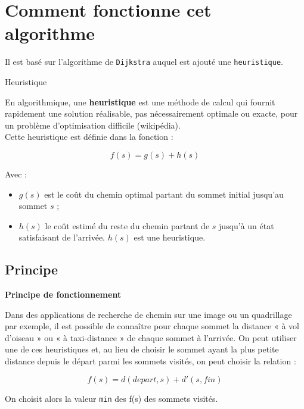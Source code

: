 \section{Comment fonctionne cet algorithme}

Il est basé sur l'algorithme de \texttt{Dijkstra} auquel est ajouté une \texttt{heuristique}.\\


\begin{defi} {Heuristique}

En algorithmique, une \textbf{heuristique} est une méthode de calcul qui fournit rapidement une solution réalisable, pas nécessairement optimale ou exacte, pour un problème d'optimisation difficile (wikipédia).\\

Cette heuristique est définie dans la fonction :

$$f(s)=g(s)+h(s) $$

Avec :
\begin{itemize}
\item $g(s)$ est le coût du chemin optimal partant du sommet initial jusqu'au sommet $s$ ;
\item $h(s)$ le coût estimé du reste du chemin partant de $s$ jusqu'à un état satisfaisant de l'arrivée. $h(s)$ est une heuristique.
\end{itemize}

\end{defi}

\subsection{Principe}


\begin{prop}\textbf{Principe de fonctionnement}

Dans des applications de recherche de chemin sur une image ou un quadrillage par exemple, il est possible de connaître pour chaque sommet la distance « à vol d'oiseau » ou « à taxi-distance » de chaque sommet à l'arrivée. On peut utiliser une de ces heuristiques et, au lieu de choisir le sommet ayant la plus petite distance depuis le départ parmi les sommets visités, on peut choisir la relation :


$$f(s)=d(depart,s)+d'(s,fin) $$

On choisit alors la valeur \texttt{min} des f(s) des sommets visités.

\end{prop}

